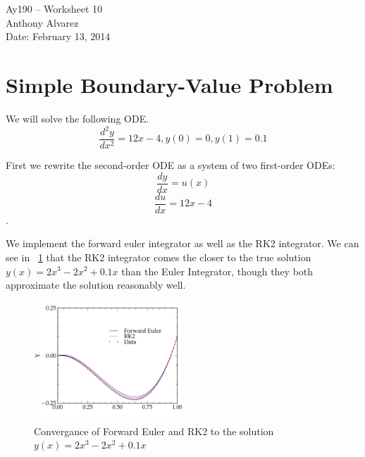 \documentclass[11pt,letterpaper]{article}
\begin{document}
\begin{center}
\Large
Ay190 -- Worksheet 10\\
Anthony Alvarez\\
Date: February 13, 2014
\end{center}

\section{Simple Boundary-Value Problem}

We will solve the following ODE. 
$$ \frac{d^2y}{dx^2} = 12x - 4, y(0) = 0, y(1) = 0.1$$

First we rewrite the second-order ODE as a system of two first-order ODEs:
$$ \frac{dy}{dx} = u(x)$$ $$ \frac{du}{dx} = 12x -4$$. 

We implement the forward euler integrator as well as the RK2 integrator. We 
can see in ~\ref{fig:converg} that the RK2 integrator comes the closer to 
the true solution $y(x) = 2x^3 - 2x^2 + 0.1x$ than the Euler Integrator, though
they both approximate the solution reasonably well. 

\begin{figure}[bth]
\centering
\includegraphics[width=0.5\textwidth]{1.pdf}
\caption{Convergance of Forward Euler and RK2 to the solution $y(x) = 2x^3 - 2x^2 + 0.1x$}
\label{fig:converg}
\end{figure}
\end{document}
